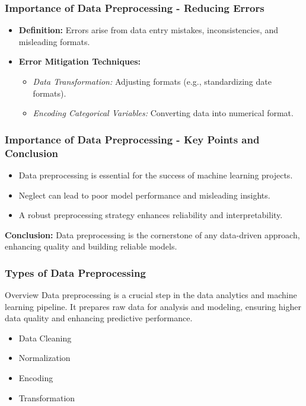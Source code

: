 \documentclass{beamer}
\begin{document}
\begin{frame}[fragile]
    \frametitle{Importance of Data Preprocessing - Reducing Errors}
    \begin{itemize}
        \item \textbf{Definition:} Errors arise from data entry mistakes, inconsistencies, and misleading formats.
        \item \textbf{Error Mitigation Techniques:}
        \begin{itemize}
            \item \textit{Data Transformation:} Adjusting formats (e.g., standardizing date formats).
            \item \textit{Encoding Categorical Variables:} Converting data into numerical format.
        \end{itemize}
    \end{itemize}
\end{frame}

\begin{frame}[fragile]
    \frametitle{Importance of Data Preprocessing - Key Points and Conclusion}
    \begin{itemize}
        \item Data preprocessing is essential for the success of machine learning projects.
        \item Neglect can lead to poor model performance and misleading insights.
        \item A robust preprocessing strategy enhances reliability and interpretability.
    \end{itemize}
    \textbf{Conclusion:} Data preprocessing is the cornerstone of any data-driven approach, enhancing quality and building reliable models.
\end{frame}

\begin{frame}[fragile]
    \frametitle{Types of Data Preprocessing}
    \begin{block}{Overview}
        Data preprocessing is a crucial step in the data analytics and machine learning pipeline. 
        It prepares raw data for analysis and modeling, ensuring higher data quality and enhancing predictive performance.
    \end{block}
    \begin{itemize}
        \item Data Cleaning
        \item Normalization
        \item Encoding
        \item Transformation
    \end{itemize}
\end{frame}
\end{document}
